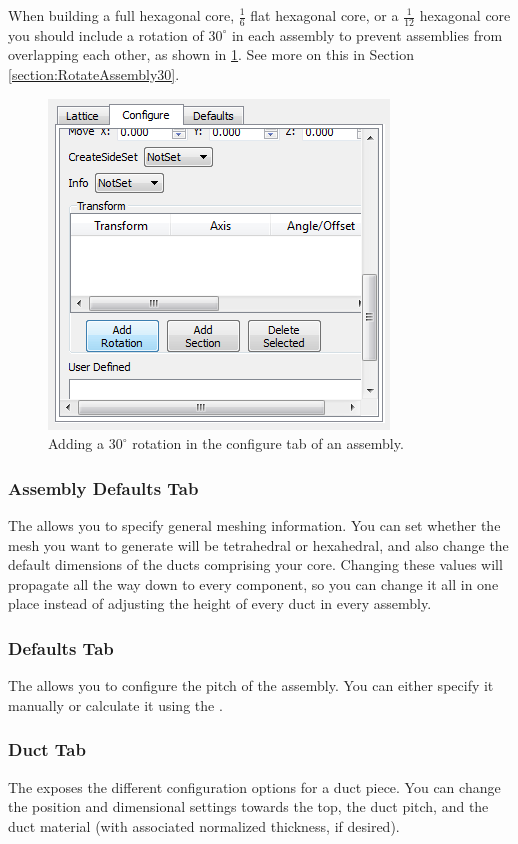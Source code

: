When building a full hexagonal core, $\frac{1}{6}$ flat hexagonal core, or a $\frac{1}{12}$ hexagonal core you should include a rotation of $30^\circ$ in each assembly to prevent assemblies from overlapping each other, as shown in \ref{fig:configuretab}.  See more on this in Section \ref{section:RotateAssembly30}.

\begin{figure}[h]
	\begin{center}
		\includegraphics[width=0.4\linewidth]{Images/hex-16.png}
		\caption{Adding a $30^\circ$ rotation in the configure tab of an assembly.}
		\label{fig:configuretab}
	\end{center}
\end{figure}

\subsubsection{Assembly Defaults Tab}
The  allows you to specify general meshing information.  You can set whether the mesh you want to generate will be tetrahedral or hexahedral, and also change the default dimensions of the ducts comprising your core.  Changing these values will propagate all the way down to every component, so you can change it all in one place instead of adjusting the height of every duct in every assembly.

\subsubsection{Defaults Tab}
The  allows you to configure the pitch of the assembly.  You can either specify it manually or calculate it using the .

\subsubsection{Duct Tab}
The  exposes the different configuration options for a duct piece.  You can change the position and dimensional settings towards the top, the duct pitch, and the duct material (with associated normalized thickness, if desired).

